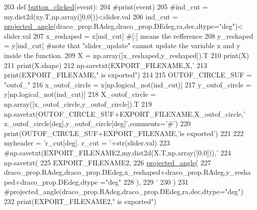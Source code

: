 \begin{DoxyCode}
203 \textcolor{keyword}{def }\hyperlink{namespaceplot__Draco__SDSS__CMD__CMcut_a476729e1148bad592cbcca8131d3d254}{button\_clicked}(event):
204     \textcolor{comment}{#print(event)}
205     \textcolor{comment}{#ind\_cut = my.dist2d(xy.T,np.array([0,0]))<slider.val}
206     ind\_cut = \hyperlink{namespacecoord_a04a9b47f67924315930327ed806ee648}{projected\_angle}(draco\_prop.RAdeg,draco\_prop.DEdeg,ra,dec,dtype=\textcolor{stringliteral}{"deg"})<
      slider.val
207     x\_reshaped = x[ind\_cut] \textcolor{comment}{#[:] means the refference}
208     y\_reshaped = y[ind\_cut] \textcolor{comment}{#note that "slider\_update" cannot update the variable x and y inside the
       function.}
209     X = np.array([x\_reshaped,y\_reshaped]).T
210     print(X)
211     print(X.shape)
212     np.savetxt(EXPORT\_FILENAME,X,\textcolor{stringliteral}{'%
213     print(EXPORT\_FILENAME,\textcolor{stringliteral}{" is exported"})
214 
215     OUTOF\_CIRCLE\_SUF = \textcolor{stringliteral}{"outof\_"}
216     x\_outof\_circle = x[np.logical\_not(ind\_cut)]
217     y\_outof\_circle = y[np.logical\_not(ind\_cut)]
218     X\_outof\_circle = np.array([x\_outof\_circle,y\_outof\_circle]).T
219     np.savetxt(OUTOF\_CIRCLE\_SUF+EXPORT\_FILENAME,X\_outof\_circle,\textcolor{stringliteral}{'%
      x\_outof\_circle[deg],y\_outof\_circle[deg]'},comments=\textcolor{stringliteral}{'#'})
220     print(OUTOF\_CIRCLE\_SUF+EXPORT\_FILENAME,\textcolor{stringliteral}{'is exported'})
221 
222     myheader = \textcolor{stringliteral}{'r\_cut[deg]. r\_cut = '}+str(slider.val)
223     \textcolor{comment}{
      #np.savetxt(EXPORT\_FILENAME2,my.dist2d(X.T,np.array([0,0])),'%
224     np.savetxt(
225         EXPORT\_FILENAME2,
226         \hyperlink{namespacecoord_a04a9b47f67924315930327ed806ee648}{projected\_angle}(
227             draco\_prop.RAdeg,draco\_prop.DEdeg,x\_reshaped+draco\_prop.RAdeg,y\_reshaped+draco\_prop.DEdeg,dtype
      =\textcolor{stringliteral}{"deg"}
228         ),
229         \textcolor{stringliteral}{'%
230     )
231     \textcolor{comment}{#projected\_angle(draco\_prop.RAdeg,draco\_prop.DEdeg,ra,dec,dtype="deg")}
232     print(EXPORT\_FILENAME2,\textcolor{stringliteral}{" is exported"})
}}}
\end{DoxyCode}
